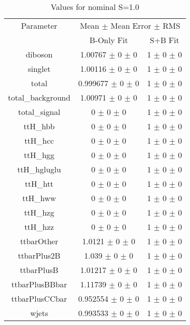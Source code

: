 \begin{table}
\centering
\caption{Values for nominal S=1.0}
\begin{tabular}{ccc}
\toprule
Parameter & \multicolumn{2}{c}{Mean $\pm$ Mean Error $\pm$ RMS}\\
 & B-Only Fit & S+B Fit\\
\midrule
diboson & \num{1.00767} $\pm$ \num{0} $\pm$ \num{0} & \num{1} $\pm$ \num{0} $\pm$ \num{0}\\
singlet & \num{1.00116} $\pm$ \num{0} $\pm$ \num{0} & \num{1} $\pm$ \num{0} $\pm$ \num{0}\\
total & \num{0.999677} $\pm$ \num{0} $\pm$ \num{0} & \num{1} $\pm$ \num{0} $\pm$ \num{0}\\
total\_background & \num{1.00971} $\pm$ \num{0} $\pm$ \num{0} & \num{1} $\pm$ \num{0} $\pm$ \num{0}\\
total\_signal & \num{0} $\pm$ \num{0} $\pm$ \num{0} & \num{1} $\pm$ \num{0} $\pm$ \num{0}\\
ttH\_hbb & \num{0} $\pm$ \num{0} $\pm$ \num{0} & \num{1} $\pm$ \num{0} $\pm$ \num{0}\\
ttH\_hcc & \num{0} $\pm$ \num{0} $\pm$ \num{0} & \num{1} $\pm$ \num{0} $\pm$ \num{0}\\
ttH\_hgg & \num{0} $\pm$ \num{0} $\pm$ \num{0} & \num{1} $\pm$ \num{0} $\pm$ \num{0}\\
ttH\_hgluglu & \num{0} $\pm$ \num{0} $\pm$ \num{0} & \num{1} $\pm$ \num{0} $\pm$ \num{0}\\
ttH\_htt & \num{0} $\pm$ \num{0} $\pm$ \num{0} & \num{1} $\pm$ \num{0} $\pm$ \num{0}\\
ttH\_hww & \num{0} $\pm$ \num{0} $\pm$ \num{0} & \num{1} $\pm$ \num{0} $\pm$ \num{0}\\
ttH\_hzg & \num{0} $\pm$ \num{0} $\pm$ \num{0} & \num{1} $\pm$ \num{0} $\pm$ \num{0}\\
ttH\_hzz & \num{0} $\pm$ \num{0} $\pm$ \num{0} & \num{1} $\pm$ \num{0} $\pm$ \num{0}\\
ttbarOther & \num{1.0121} $\pm$ \num{0} $\pm$ \num{0} & \num{1} $\pm$ \num{0} $\pm$ \num{0}\\
ttbarPlus2B & \num{1.039} $\pm$ \num{0} $\pm$ \num{0} & \num{1} $\pm$ \num{0} $\pm$ \num{0}\\
ttbarPlusB & \num{1.01217} $\pm$ \num{0} $\pm$ \num{0} & \num{1} $\pm$ \num{0} $\pm$ \num{0}\\
ttbarPlusBBbar & \num{1.11739} $\pm$ \num{0} $\pm$ \num{0} & \num{1} $\pm$ \num{0} $\pm$ \num{0}\\
ttbarPlusCCbar & \num{0.952554} $\pm$ \num{0} $\pm$ \num{0} & \num{1} $\pm$ \num{0} $\pm$ \num{0}\\
wjets & \num{0.993533} $\pm$ \num{0} $\pm$ \num{0} & \num{1} $\pm$ \num{0} $\pm$ \num{0}\\
\bottomrule
\end{tabular}
\end{table}